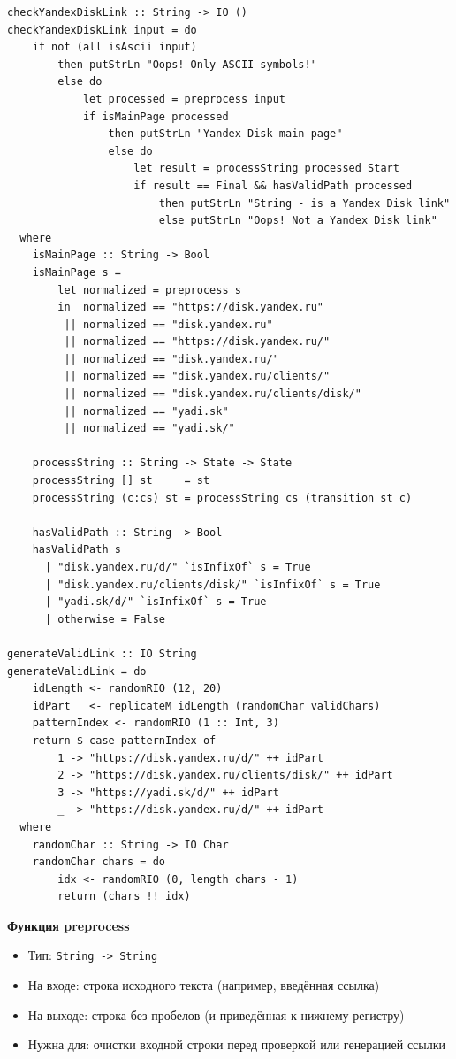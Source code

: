 \documentclass[areasetadvanced]{scrartcl}
\begin{document}
\begin{lstlisting}[caption={Lib.hs}, label={lst:example}]
checkYandexDiskLink :: String -> IO ()
checkYandexDiskLink input = do
    if not (all isAscii input)
        then putStrLn "Oops! Only ASCII symbols!"
        else do
            let processed = preprocess input
            if isMainPage processed
                then putStrLn "Yandex Disk main page"
                else do
                    let result = processString processed Start
                    if result == Final && hasValidPath processed
                        then putStrLn "String - is a Yandex Disk link"
                        else putStrLn "Oops! Not a Yandex Disk link"
  where
    isMainPage :: String -> Bool
    isMainPage s = 
        let normalized = preprocess s
        in  normalized == "https://disk.yandex.ru"
         || normalized == "disk.yandex.ru"
         || normalized == "https://disk.yandex.ru/"
         || normalized == "disk.yandex.ru/"
         || normalized == "disk.yandex.ru/clients/"
         || normalized == "disk.yandex.ru/clients/disk/"
         || normalized == "yadi.sk"
         || normalized == "yadi.sk/"

    processString :: String -> State -> State
    processString [] st     = st
    processString (c:cs) st = processString cs (transition st c)
    
    hasValidPath :: String -> Bool
    hasValidPath s
      | "disk.yandex.ru/d/" `isInfixOf` s = True
      | "disk.yandex.ru/clients/disk/" `isInfixOf` s = True
      | "yadi.sk/d/" `isInfixOf` s = True
      | otherwise = False

generateValidLink :: IO String
generateValidLink = do
    idLength <- randomRIO (12, 20)
    idPart   <- replicateM idLength (randomChar validChars)
    patternIndex <- randomRIO (1 :: Int, 3)
    return $ case patternIndex of
        1 -> "https://disk.yandex.ru/d/" ++ idPart
        2 -> "https://disk.yandex.ru/clients/disk/" ++ idPart
        3 -> "https://yadi.sk/d/" ++ idPart
        _ -> "https://disk.yandex.ru/d/" ++ idPart
  where
    randomChar :: String -> IO Char
    randomChar chars = do
        idx <- randomRIO (0, length chars - 1)
        return (chars !! idx)
\end{lstlisting}
\textbf{Функция preprocess}
\begin{itemize}
  \item Тип: \texttt{String -> String}
  \item На входе: строка исходного текста (например, введённая ссылка)
  \item На выходе: строка без пробелов (и приведённая к нижнему регистру)
  \item Нужна для: очистки входной строки перед проверкой или генерацией ссылки
\end{itemize}
\end{document}
